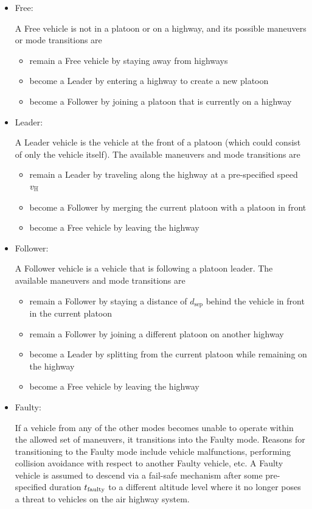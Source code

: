 \begin{itemize}
\item Free: 

A Free vehicle is not in a platoon or on a highway, and its possible maneuvers or mode transitions are
\begin{itemize}
\item remain a Free vehicle by staying away from highways
\item become a Leader by entering a highway to create a new platoon
\item become a Follower by joining a platoon that is currently on a highway
\end{itemize} 

\item Leader: 

A Leader vehicle is the vehicle at the front of a platoon (which could consist of only the vehicle itself). The available maneuvers and mode transitions are

\begin{itemize}
\item remain a Leader by traveling along the highway at a pre-specified speed $v_{\mathbb{H}}$
\item become a Follower by merging the current platoon with a platoon in front
\item become a Free vehicle by leaving the highway
\end{itemize}

\item Follower: 

A Follower vehicle is a vehicle that is following a platoon leader. The available maneuvers and mode transitions are 

\begin{itemize}
\item remain a Follower by staying a distance of $d_\text{sep}$ behind the vehicle in front in the current platoon
\item remain a Follower by joining a different platoon on another highway
\item become a Leader by splitting from the current platoon while remaining on the highway
\item become a Free vehicle by leaving the highway
\end{itemize}

\item Faulty: 

If a vehicle from any of the other modes becomes unable to operate within the allowed set of maneuvers, it transitions into the Faulty mode. Reasons for transitioning to the Faulty mode include vehicle malfunctions, performing collision avoidance with respect to another Faulty vehicle, etc. A Faulty vehicle is assumed to descend via a fail-safe mechanism after some pre-specified duration $t_\text{faulty}$ to a different altitude level where it no longer poses a threat to vehicles on the air highway system.
\end{itemize}

